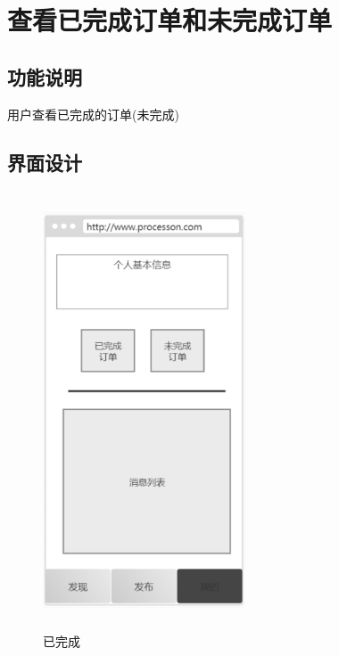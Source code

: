 \newpage
\section{查看已完成订单和未完成订单}

\subsection{功能说明}
用户查看已完成的订单(未完成)

\subsection{界面设计}
\begin{figure}[htbp]
    \centering
    \begin{minipage}[t]{0.48\textwidth}
    \centering
    \includegraphics[width=6cm,height=13cm]{design/image/ui8.png} 
    \caption{已完成}
    \end{minipage}
    \begin{minipage}[t]{0.48\textwidth}
    \centering

\end{minipage}
\end{figure}

